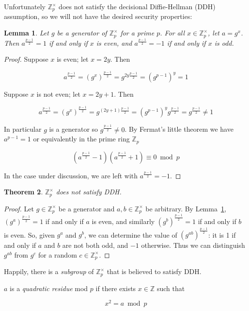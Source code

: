 \documentclass[12pt,a4paper]{article}
\newtheorem{theorem}{Theorem}
\newtheorem{lemma}[theorem]{Lemma}
\theoremstyle{definition}
\begin{document}
Unfortunately $\mathbb{Z}^\times_p$ does not satisfy the decisional Diffie-Hellman (DDH) assumption, so we will not have the desired security properties:
\begin{lemma}\label{lem-parity}
    Let $g$ be a generator of $\mathbb{Z}^\times_p$ for a prime $p$. For all $x\in\mathbb{Z}^\times_p$, let $a=g^x$. Then $a^{\frac{p-1}{2}} = 1$ if and only if $x$ is even, and $a^{\frac{p-1}{2}} = -1$ if and only if $x$ is odd.
\end{lemma}
\begin{proof}
    Suppose $x$ is even; let $x=2y$. Then

    $$a^{\frac{p-1}{2}}=(g^x)^{\frac{p-1}{2}}=g^{2y\frac{p-1}{2}}=(g^{p-1})^y=1$$

    Suppose $x$ is not even; let $x=2y+1$. Then

    $$a^{\frac{p-1}{2}}=(g^x)^{\frac{p-1}{2}}=g^{(2y+1)\frac{p-1}{2}}=(g^{p-1})^yg^{\frac{p-1}{2}}=g^{\frac{p-1}{2}}\neq 1$$

    In particular $g$ is a generator so $g^\frac{p-1}{2}\neq 0$. By Fermat's little theorem we have $a^{p-1}=1$ or equivalently in the prime ring $\mathbb{Z}_p$

    $$\left(a^\frac{p-1}{2}-1\right)\left(a^\frac{p-1}{2}+1\right)\equiv 0\bmod p$$
    
    In the case under discussion, we are left with $a^\frac{p-1}{2}=-1$.
\end{proof}
\begin{theorem}
    $\mathbb{Z}^\times_p$ does not satisfy DDH.
\end{theorem}
\begin{proof}
    Let $g\in\mathbb{Z}^\times_p$ be a generator and $a,b\in\mathbb{Z}^\times_p$ be arbitrary. By Lemma~\ref{lem-parity}, $(g^a)^{\frac{p-1}{2}}=1$ if and only if $a$ is even, and similarly $(g^b)^{\frac{p-1}{2}}=1$ if and only if $b$ is even. So, given $g^a$ and $g^b$, we can determine the value of $\left(g^{ab}\right)^\frac{p-1}{2}$: it is 1 if and only if $a$ and $b$ are not both odd, and $-1$ otherwise. Thus we can distinguish $g^{ab}$ from $g^c$ for a random $c\in\mathbb{Z}^\times_p$.
\end{proof}

Happily, there is a \textit{subgroup} of $\mathbb{Z}^\times_p$ that is believed to satisfy DDH.
\begin{definition}
    $a$ is a \textit{quadratic residue} mod $p$ if there exists $x\in\mathbb{Z}$ such that

    $$x^2=a\bmod p$$

\end{definition}
\end{document}
